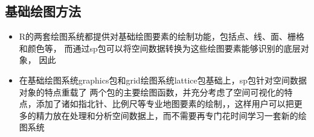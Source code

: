 
\subsection{基础绘图方法}
\begin{frame}[t]{\subsecname}
\begin{itemize} 
\item<1-> R的两套绘图系统都提供对基础绘图要素的绘制功能，包括点、线、面、栅格和颜色等，
而通过sp包可以将空间数据转换为这些绘图要素能够识别的底层对象，
因此
\item<2-> 在基础绘图系统graphics包和grid绘图系统lattice包基础上，sp包针对空间数据对象的特点重载了
两个包的主要绘图函数，并充分考虑了空间可视化的特点，添加了诸如指北针、比例尺等专业地图要素的绘制，，这样用户可以把更多的精力放在处理和分析空间数据上，而不需要再专门花时间学习一套新的绘图系统\end{itemize}
\end{frame}

